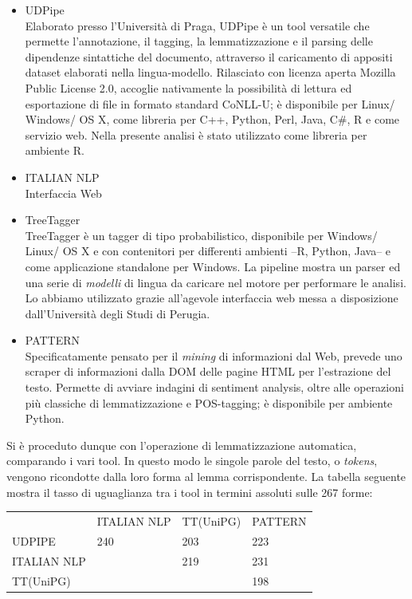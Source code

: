 \begin{itemize}
\item
  UDPipe \autocite{udpipe2017}\\
  Elaborato presso l'Università di Praga, UDPipe è un tool versatile che
  permette l'annotazione, il tagging, la lemmatizzazione e il parsing
  delle dipendenze sintattiche del documento, attraverso il caricamento
  di appositi dataset elaborati nella lingua-modello. Rilasciato con
  licenza aperta Mozilla Public License 2.0, accoglie nativamente la
  possibilità di lettura ed esportazione di file in formato standard
  CoNLL-U; è disponibile per Linux/ Windows/ OS X, come libreria per
  C++, Python, Perl, Java, C\#, R e come servizio web. Nella presente
  analisi è stato utilizzato come libreria per ambiente R.
\item
  ITALIAN NLP\\
  Interfaccia Web
\item
  TreeTagger \autocite{schmid1994b}\\
  TreeTagger è un tagger di tipo probabilistico, disponibile per
  Windows/ Linux/ OS X e con contenitori per differenti ambienti --R,
  Python, Java-- e come applicazione standalone per Windows. La pipeline
  mostra un parser ed una serie di \emph{modelli} di lingua da caricare
  nel motore per performare le analisi. Lo abbiamo utilizzato grazie
  all'agevole interfaccia web messa a disposizione dall'Università degli
  Studi di Perugia.
\item
  PATTERN \autocite{pattern2012}\\
  Specificatamente pensato per il \emph{mining} di informazioni dal Web,
  prevede uno scraper di informazioni dalla DOM delle pagine HTML per
  l'estrazione del testo. Permette di avviare indagini di sentiment
  analysis, oltre alle operazioni più classiche di lemmatizzazione e
  POS-tagging; è disponibile per ambiente Python.
\end{itemize}

Si è proceduto dunque con l'operazione di lemmatizzazione automatica,
comparando i vari tool. In questo modo le singole parole del testo, o
\emph{tokens}, vengono ricondotte dalla loro forma al lemma
corrispondente. La tabella seguente mostra il tasso di uguaglianza tra i
tool in termini assoluti sulle 267 forme:

\begin{longtable}[]{@{}llll@{}}
\toprule
& ITALIAN NLP & TT(UniPG) & PATTERN\tabularnewline
UDPIPE & 240 & 203 & 223\tabularnewline
ITALIAN NLP & & 219 & 231\tabularnewline
TT(UniPG) & & & 198\tabularnewline
\bottomrule
\end{longtable}

